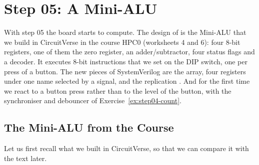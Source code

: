 \chapter{Step 05: A Mini-ALU}
\label{ch:step05}


\providecommand{\ccpct}{\begingroup\catcode`\%=12 \ccpctaux}
\providecommand{\ccpctaux}[1]{\cc{#1}\endgroup}

With step 05 the board starts to compute. The design of  is
the Mini-ALU that we build in CircuitVerse in the course HPC0 (worksheets 4
and 6): four 8-bit registers, one of them the zero register, an
adder/subtractor, four status flags and a decoder. It executes 8-bit
instructions that we set on the DIP switch, one per press of a button. The
new pieces of SystemVerilog are the array, four registers under one name
selected by a signal, and the replication . And for the first
time we react to a button press rather than to the level of the button, with
the synchroniser and debouncer of Exercise~\ref{ex:step04-count}.

\section{The Mini-ALU from the Course}
\label{sec:step05-course}

Let us first recall what we built in CircuitVerse, so that we can compare it
with the text later.

